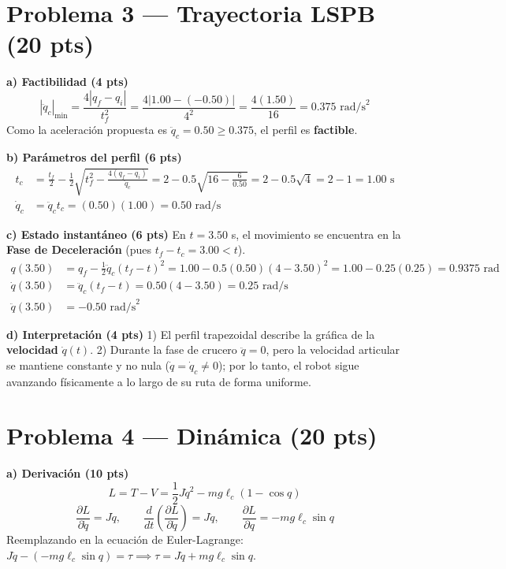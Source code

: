 \documentclass[11pt, a4paper]{article}
\begin{document}
\section*{Problema 3 — Trayectoria LSPB (20 pts)}

\textbf{a) Factibilidad (4 pts)}
\begin{equation*}
    |\ddot{q}_c|_{\min} = \frac{4|q_f - q_i|}{t_f^2} = \frac{4|1.00 - (-0.50)|}{4^2} = \frac{4(1.50)}{16} = \boxed{ 0.375 \text{ rad/s}^2 } \text{}
\end{equation*}
Como la aceleración propuesta es $\ddot{q}_c = 0.50 \ge 0.375$, el perfil es \textbf{factible}.

\textbf{b) Parámetros del perfil (6 pts)}
\begin{align*}
    t_c &= \frac{t_f}{2} - \frac{1}{2}\sqrt{t_f^2 - \frac{4(q_f - q_i)}{\ddot{q}_c}} = 2 - 0.5\sqrt{16 - \frac{6}{0.50}} = 2 - 0.5\sqrt{4} = 2 - 1 = \boxed{ 1.00 \text{ s} } \text{} \\
    \dot{q}_c &= \ddot{q}_c t_c = (0.50)(1.00) = \boxed{ 0.50 \text{ rad/s} } \text{}
\end{align*}

\textbf{c) Estado instantáneo (6 pts)}
En $t = 3.50$ s, el movimiento se encuentra en la \textbf{Fase de Deceleración} (pues $t_f - t_c = 3.00 < t$).
\begin{align*}
    q(3.50) &= q_f - \frac{1}{2}\ddot{q}_c(t_f - t)^2 = 1.00 - 0.5(0.50)(4 - 3.50)^2 = 1.00 - 0.25(0.25) = \boxed{ 0.9375 \text{ rad} } \text{} \\
    \dot{q}(3.50) &= \ddot{q}_c(t_f - t) = 0.50(4 - 3.50) = \boxed{ 0.25 \text{ rad/s} } \text{} \\
    \ddot{q}(3.50) &= \boxed{ -0.50 \text{ rad/s}^2 } \text{}
\end{align*}

\textbf{d) Interpretación (4 pts)}
1) El perfil trapezoidal describe la gráfica de la \textbf{velocidad} $\dot{q}(t)$. 2) Durante la fase de crucero $\ddot{q} = 0$, pero la velocidad articular se mantiene constante y no nula ($\dot{q} = \dot{q}_c \neq 0$); por lo tanto, el robot sigue avanzando físicamente a lo largo de su ruta de forma uniforme.

\section*{Problema 4 — Dinámica (20 pts)}

\textbf{a) Derivación (10 pts)}
\begin{equation*}
    L = T - V = \frac{1}{2}J\dot{q}^2 - mg\ell_c(1 - \cos q) \text{}
\end{equation*}
\begin{equation*}
    \frac{\partial L}{\partial \dot{q}} = J\dot{q}, \qquad \frac{d}{dt}\left(\frac{\partial L}{\partial \dot{q}}\right) = J\ddot{q}, \qquad \frac{\partial L}{\partial q} = -mg\ell_c\sin q \text{}
\end{equation*}
Reemplazando en la ecuación de Euler-Lagrange: $J\ddot{q} - (-mg\ell_c\sin q) = \tau \implies \boxed{ \tau = J\ddot{q} + mg\ell_c\sin q }$.
\end{document}
